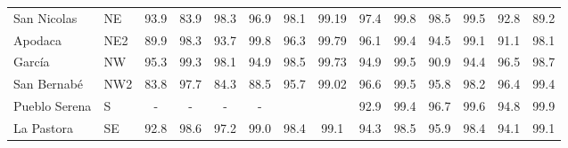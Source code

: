 \begin{table}[H]
\begin{tabular}{llcccccccccccc}
San Nicolas                                                                                  & NE                                         & 93.9       & 83.9      & 98.3       & 96.9       & 98.1                                                 & 99.19                                                & 97.4        & 99.8       & 98.5  & 99.5                                                 & 92.8                                                & 89.2 \\
Apodaca                                                                                      & NE2                                        & 89.9       & 98.3      & 93.7       & 99.8       & 96.3                                                 & 99.79                                                & 96.1        & 99.4       & 94.5  & 99.1                                                 & 91.1                                                & 98.1 \\
García                                                                                       & NW                                         & 95.3       & 99.3      & 98.1       & 94.9       & 98.5                                                 & 99.73                                                & 94.9        & 99.5       & 90.9  & 94.4                                                 & 96.5                                                & 98.7 \\
San Bernabé                                                                                  & NW2                                        & 83.8       & 97.7      & 84.3       & 88.5       & 95.7                                                 & 99.02                                                & 96.6        & 99.5       & 95.8  & 98.2                                                 & 96.4                                                & 99.4 \\
Pueblo Serena                                                                                & S                                          & -          & -         & -          & -          & \cellcolor[HTML]{CB0000}{\color[HTML]{FFFFFF} 22.8}  & \cellcolor[HTML]{CB0000}{\color[HTML]{FFFFFF} 23.69} & 92.9        & 99.4       & 96.7  & 99.6                                                 & 94.8                                                & 99.9 \\
La Pastora                                                                                   & SE                                         & 92.8       & 98.6      & 97.2       & 99.0       & 98.4                                                 & 99.1                                                 & 94.3        & 98.5       & 95.9  & 98.4                                                 & 94.1                                                & 99.1 \\

\end{tabular}
\end{table}
